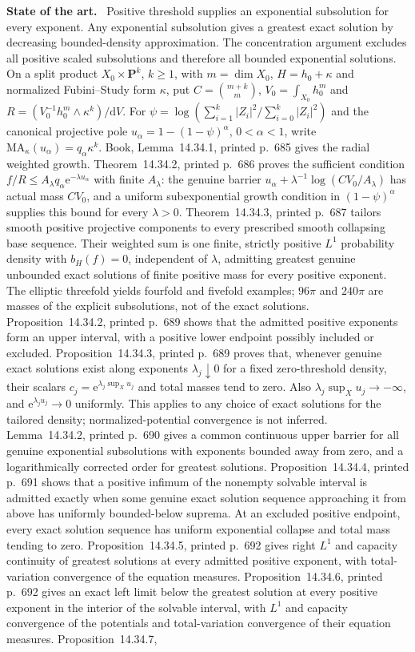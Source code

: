 \documentclass[11pt]{article}
\newcommand{\field}[1]{\par\medskip\noindent\textbf{#1.}\ }
\begin{document}
\field{State of the art} Positive threshold supplies an exponential subsolution for every exponent. Any exponential subsolution gives a greatest exact solution by decreasing bounded-density approximation. The concentration argument excludes all positive scaled subsolutions and therefore all bounded exponential solutions. On a split product $X_0\times\mathbf P^k$, $k\geq1$, with $m=\dim X_0$, $H=h_0+\kappa$ and normalized Fubini--Study form $\kappa$, put $C=\binom{m+k}{m}$, $V_0=\int_{X_0}h_0^m$ and $R=(V_0^{-1}h_0^m\wedge\kappa^k)/\mathrm dV$. For $\psi=\log(\sum_{i=1}^k|Z_i|^2/\sum_{i=0}^k|Z_i|^2)$ and the canonical projective pole $u_\alpha=1-(1-\psi)^\alpha$, $0<\alpha<1$, write $\mathrm{MA}_\kappa(u_\alpha)=q_\alpha\kappa^k$. Book, Lemma~14.34.1, printed p.~685 gives the radial weighted growth. Theorem~14.34.2, printed p.~686 proves the sufficient condition $f/R\leq A_\lambda q_\alpha\mathrm e^{-\lambda u_\alpha}$ with finite $A_\lambda$: the genuine barrier $u_\alpha+\lambda^{-1}\log(CV_0/A_\lambda)$ has actual mass $CV_0$, and a uniform subexponential growth condition in $(1-\psi)^\alpha$ supplies this bound for every $\lambda>0$. Theorem~14.34.3, printed p.~687 tailors smooth positive projective components to every prescribed smooth collapsing base sequence. Their weighted sum is one finite, strictly positive $L^1$ probability density with $b_H(f)=0$, independent of $\lambda$, admitting greatest genuine unbounded exact solutions of finite positive mass for every positive exponent. The elliptic threefold yields fourfold and fivefold examples; $96\pi$ and $240\pi$ are masses of the explicit subsolutions, not of the exact solutions. Proposition~14.34.2, printed p.~689 shows that the admitted positive exponents form an upper interval, with a positive lower endpoint possibly included or excluded. Proposition~14.34.3, printed p.~689 proves that, whenever genuine exact solutions exist along exponents $\lambda_j\downarrow0$ for a fixed zero-threshold density, their scalars $c_j=\mathrm e^{\lambda_j\sup_Xu_j}$ and total masses tend to zero. Also $\lambda_j\sup_Xu_j\to-\infty$, and $\mathrm e^{\lambda_ju_j}\to0$ uniformly. This applies to any choice of exact solutions for the tailored density; normalized-potential convergence is not inferred. Lemma~14.34.2, printed p.~690 gives a common continuous upper barrier for all genuine exponential subsolutions with exponents bounded away from zero, and a logarithmically corrected order for greatest solutions. Proposition~14.34.4, printed p.~691 shows that a positive infimum of the nonempty solvable interval is admitted exactly when some genuine exact solution sequence approaching it from above has uniformly bounded-below suprema. At an excluded positive endpoint, every exact solution sequence has uniform exponential collapse and total mass tending to zero. Proposition~14.34.5, printed p.~692 gives right $L^1$ and capacity continuity of greatest solutions at every admitted positive exponent, with total-variation convergence of the equation measures. Proposition~14.34.6, printed p.~692 gives an exact left limit below the greatest solution at every positive exponent in the interior of the solvable interval, with $L^1$ and capacity convergence of the potentials and total-variation convergence of their equation measures. Proposition~14.34.7, 
\end{document}
